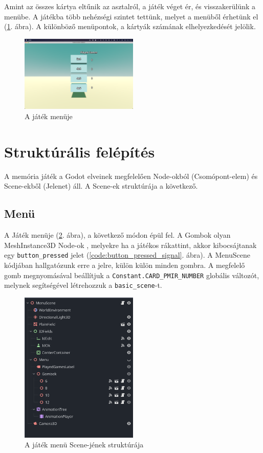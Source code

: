 Amint az összes kártya eltűnik az asztalról, a játék véget ér, és visszakerülünk a menübe.
A játékba több nehézségi szintet tettünk, melyet a menüből érhetünk el (\ref{img:menu}. ábra). A különböző menüpontok, a kártyák számának elhelyezkedését jelölik.
\begin{figure}[h]
    \centering
    \includegraphics[width=0.5\textwidth]{img/menu.png}
    \caption{A játék menüje}
    \label{img:menu}  
\end{figure}

\section{Struktúrális felépítés}
A memória játék a Godot elveinek megfelelően Node-okból (Csomópont-elem) és Scene-ekből (Jelenet) \cite{godotengineNodesScenes} áll. A Scene-ek struktúrája a következő.
\subsection{Menü}


A Játék menüje (\ref{img:menu_scene}. ábra), a következő módon épül fel.
A Gombok olyan MeshInstance3D Node-ok \cite{godotengineMeshInstance3D}, melyekre ha a játékos rákattint, akkor kibocsájtanak egy \lstinline{button_pressed} jelet (\ref{code:button_pressed_signal}. ábra).
A MenuScene kódjában hallgatózunk erre a jelre, külön külön minden gombra.
A megfelelő gomb megnyomásával beállítjuk a \lstinline{Constant.CARD_PMIR_NUMBER} globális változót, melynek segítségével létrehozzuk a \lstinline{basic_scene}-t.

\begin{figure}[h]
    \centering
    \includegraphics[width=0.5\textwidth]{img/menu_scene_tree.png}
    \caption{A játék menü Scene-jének struktúrája}
    \label{img:menu_scene}  
\end{figure}

